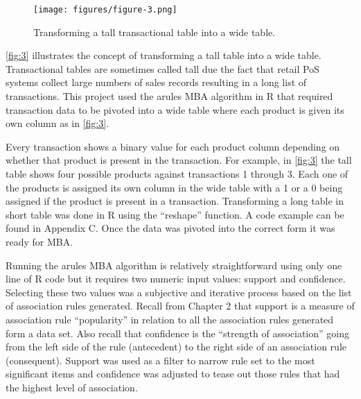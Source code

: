 \documentclass[../article.tex, 12pt]{subfiles}
\begin{document}
\begin{multicols*}{2}
\begin{figure*}
\texttt{[image: figures/figure-3.png]}
\captionsetup{margin=.1\linewidth}
\caption{Transforming a tall transactional table into a wide table.}
\label{fig:3}
\end{figure*}


\par
\autoref{fig:3} illustrates the concept of transforming a tall table into a wide table. Transactional tables are sometimes called tall due the fact that retail PoS systems collect large numbers of sales records resulting in a long list of transactions. This project used the arules MBA algorithm in R \citep{arules} that required transaction data to be pivoted into a wide table where each product is given its own column as in \autoref{fig:3}.

\par
Every transaction shows a binary value for each product column depending on whether that product is present in the transaction. For example, in \autoref{fig:3} the tall table shows four possible products against transactions 1 through 3. Each one of the products is assigned its own column in the wide table with a 1 or a 0 being assigned if the product is present in a transaction. Transforming a long table in short table was done in R using the ``reshape'' function. A code example can be found in Appendix C. Once the data was pivoted into the correct form it was ready for MBA. 

\par
Running the arules MBA algorithm is relatively straightforward using only one line of R code but it requires two numeric input values: support and confidence. Selecting these two values was a subjective and iterative process based on the list of association rules generated. Recall from Chapter 2 that support is a measure of association rule ``popularity'' in relation to all the association rules generated form a data set. Also recall that confidence is the ``strength of association'' going from the left side of the rule (antecedent) to the right side of an association rule (consequent). Support was used as a filter to narrow rule set to the most significant items and confidence was adjusted to tease out those rules that had the highest level of association.


\end{multicols*}
\end{document}
